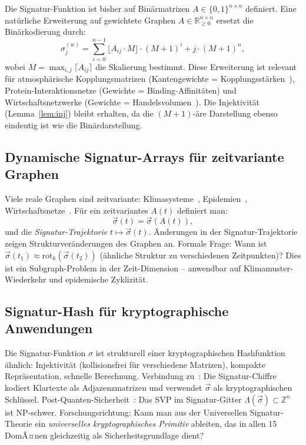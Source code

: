 ﻿\documentclass[a4paper,12pt]{article}
\theoremstyle{definition}
\begin{document}
Die Signatur-Funktion ist bisher auf Bin\"armatrizen $A \in \{0,1\}^{n\times n}$
definiert. Eine nat\"urliche Erweiterung auf gewichtete Graphen
$A \in \mathbb{R}_{\geq 0}^{n\times n}$ ersetzt die Bin\"arkodierung durch:
\[
\sigma_j^{(w)} = \sum_{i=0}^{n-1} \lfloor A_{ij} \cdot M \rfloor \cdot (M+1)^i
+ j \cdot (M+1)^n,
\]
wobei $M = \max_{i,j} \lceil A_{ij} \rceil$ die Skalierung bestimmt.
Diese Erweiterung ist relevant f\"ur atmosph\"arische Kopplungsmatrizen
(Kantengewichte = Kopplungsst\"arken~\cite{epp2026klima}),
Protein-Interaktionsnetze (Gewichte = Binding-Affinit\"aten) und
Wirtschaftsnetzwerke (Gewichte = Handelsvolumen~\cite{epp2026spieltheorie}).
Die Injektivit\"at (Lemma~\ref{lem:inj}) bleibt erhalten, da die
$(M+1)$-\"are Darstellung ebenso eindeutig ist wie die Bin\"ardarstellung.

\subsection{Dynamische Signatur-Arrays f\"ur zeitvariante Graphen}

Viele reale Graphen sind zeitvariante: Klimasysteme~\cite{epp2026klima},
Epidemien~\cite{epp2026hantavirus}, Wirtschaftsnetze~\cite{epp2026spieltheorie}.
F\"ur ein zeitvariantes $A(t)$ definiert man:
\[
\vec{\sigma}(t) = \vec{\sigma}(A(t)),
\]
und die \emph{Signatur-Trajektorie} $t \mapsto \vec{\sigma}(t)$.
\"Anderungen in der Signatur-Trajektorie zeigen Strukturver\"anderungen des Graphen an.
Formale Frage: Wann ist $\vec{\sigma}(t_1) \approx \mathrm{rot}_k(\vec{\sigma}(t_2))$
(\"ahnliche Struktur zu verschiedenen Zeitpunkten)?
Dies ist ein Subgraph-Problem in der Zeit-Dimension -- anwendbar auf
Klimamuster-Wiederkehr und epidemische Zyklizit\"at.

\subsection{Signatur-Hash f\"ur kryptographische Anwendungen}

Die Signatur-Funktion $\sigma$ ist strukturell einer kryptographischen
Hashfunktion \"ahnlich: Injektivit\"at (kollisionsfrei f\"ur verschiedene
Matrizen), kompakte Repr\"asentation, schnelle Berechnung.
Verbindung zu~\cite{epp2026sigchiffre,epp2026pqc}:
Die Signatur-Chiffre kodiert Klartexte als Adjazenzmatrizen und verwendet
$\vec{\sigma}$ als kryptographischen Schl\"ussel.
Post-Quanten-Sicherheit~\cite{epp2026lattice}: Das SVP im Signatur-Gitter
$\Lambda(\vec{\sigma}) \subset \mathbb{Z}^n$ ist NP-schwer.
Forschungsrichtung: Kann man aus der Universellen Signatur-Theorie ein
\emph{universelles kryptographisches Primitiv} ableiten, das in allen 15 DomÃ¤nen
gleichzeitig als Sicherheitsgrundlage dient?
\end{document}
